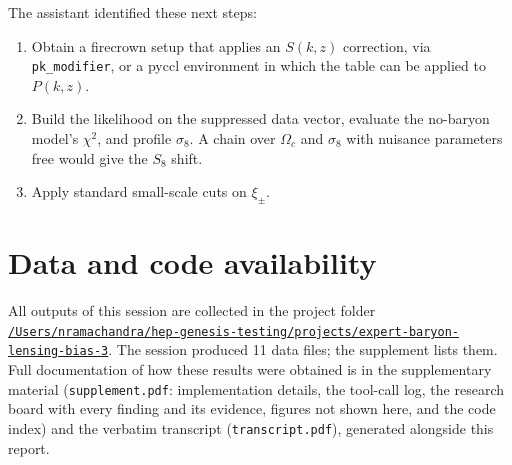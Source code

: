 \documentclass[11pt,a4paper]{article}
\begin{document}
The assistant identified these next steps:
\begin{enumerate}
\item Obtain a firecrown setup that applies an $S(k,z)$ correction, via \texttt{pk\_modifier}, or a pyccl environment in which the table can be applied to $P(k,z)$.
\item Build the likelihood on the suppressed data vector, evaluate the no-baryon model's $\chi^2$, and profile $\sigma_8$. A chain over $\Omega_c$ and $\sigma_8$ with nuisance parameters free would give the $S_8$ shift.
\item Apply standard small-scale cuts on $\xi_\pm$.
\end{enumerate}

\section*{Data and code availability}
All outputs of this session are collected in the project folder \href{file:///Users/nramachandra/hep-genesis-testing/projects/expert-baryon-lensing-bias-3}{\texttt{/\allowbreak{}Users/\allowbreak{}nramachandra/\allowbreak{}hep-genesis-testing/\allowbreak{}projects/\allowbreak{}expert-baryon-lensing-bias-3}}.
The session produced 11 data files; the supplement lists them.
Full documentation of how these results were obtained is in the supplementary material (\texttt{supplement.pdf}: implementation details, the tool-call log, the research board with every finding and its evidence, figures not shown here, and the code index) and the verbatim transcript (\texttt{transcript.pdf}), generated alongside this report.
\end{document}
